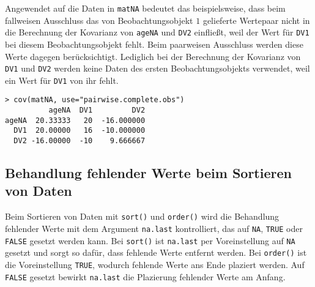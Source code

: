 Angewendet auf die Daten in \lstinline!matNA! bedeutet das beispielsweise, dass beim fallweisen Ausschluss das von Beobachtungsobjekt $1$ gelieferte Wertepaar nicht in die Berechnung der Kovarianz von \lstinline!ageNA! und \lstinline!DV2! einfließt, weil der Wert für \lstinline!DV1! bei diesem Beobachtungsobjekt fehlt. Beim paarweisen Ausschluss werden diese Werte dagegen berücksichtigt. Lediglich bei der Berechnung der Kovarianz von \lstinline!DV1! und \lstinline!DV2! werden keine Daten des ersten Beobachtungsobjekts verwendet, weil ein Wert für \lstinline!DV1! von ihr fehlt.
\begin{lstlisting}
> cov(matNA, use="pairwise.complete.obs")
          ageNA  DV1         DV2
ageNA  20.33333   20  -16.000000
  DV1  20.00000   16  -10.000000
  DV2 -16.00000  -10    9.666667
\end{lstlisting}


\subsection{Behandlung fehlender Werte beim Sortieren von Daten}
\label{sec:sortNA}

Beim Sortieren von Daten mit \lstinline!sort()! und \lstinline!order()! wird die Behandlung fehlender Werte mit dem Argument \lstinline!na.last! kontrolliert, das auf \lstinline!NA!, \lstinline!TRUE! oder \lstinline!FALSE! gesetzt werden kann. Bei \lstinline!sort()! ist \lstinline!na.last! per Voreinstellung auf \lstinline!NA! gesetzt und sorgt so dafür, dass fehlende Werte entfernt werden. Bei \lstinline!order()! ist die Voreinstellung \lstinline!TRUE!, wodurch fehlende Werte ans Ende plaziert werden. Auf \lstinline!FALSE! gesetzt bewirkt \lstinline!na.last! die Plazierung fehlender Werte am Anfang.

